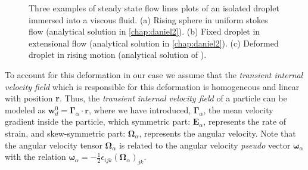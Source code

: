 \begin{figure}
    \centering
    \caption{Three examples of steady state flow lines plots of an isolated droplet immersed into a viscous fluid. 
    (a) Rising sphere in uniform stokes flow (analytical solution in \ref{chap:daniel2}). 
    (b) Fixed droplet in extensional flow (analytical solution in \ref{chap:daniel2}).
    (c) Deformed droplet in rising motion (analytical solution of \citet{taylor1964deformation}). }
    \label{fig:flowlines}
\end{figure} 
To account for this deformation in our case we assume that the \textit{transient internal velocity field} which is responsible for this deformation is homogeneous and linear with position \textbf{r}. 
Thus, the \textit{transient internal velocity field} of a particle can be modeled as $\textbf{w}_d^0 = \bm\Gamma_\alpha \cdot \textbf{r}$, where we have introduced, $\bm\Gamma_\alpha$, the mean velocity gradient inside the particle, which symmetric part: $\textbf{E}_\alpha$, represents the rate of strain, and skew-symmetric part: $\bm\Omega_\alpha$, represents the angular velocity. 
Note that the angular velocity tensor $\bm\Omega_\alpha$ is related to the angular velocity \textit{pseudo} vector $\bm\omega_\alpha$ with the relation $\bm\omega_\alpha = -\frac{1}{2}\epsilon_{ijk} (\bm\Omega_\alpha)_{jk}$. 

